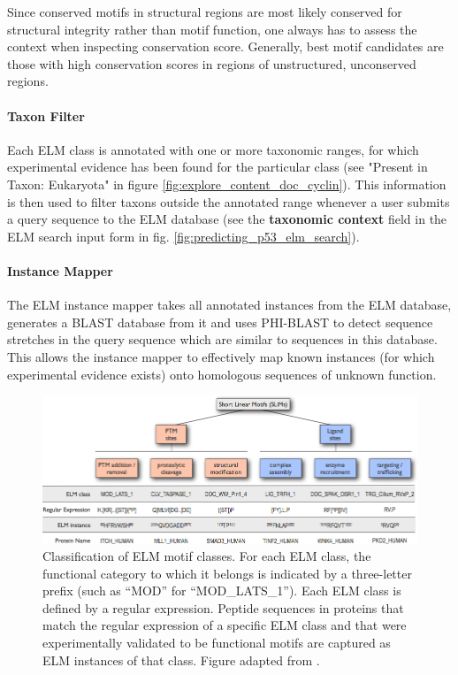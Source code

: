 \documentclass[12pt]{article}
\newcommand\button[1]{%
	\textbf{#1}%
}
\begin{document}
Since conserved motifs in structural regions are most likely conserved for
structural integrity rather than motif function, one always has to assess the
context when inspecting conservation score. Generally, best motif candidates
are those with high conservation scores in regions of unstructured, unconserved
regions.


\paragraph*{Taxon Filter}\label{TaxonFilter}

Each ELM class is annotated with one or more taxonomic ranges, for which
experimental evidence has been found for the particular class
(see "Present in Taxon: Eukaryota" in figure
\ref{fig:explore_content_doc_cyclin}). This information is then used to filter taxons
outside the annotated range whenever a user submits a query sequence to the ELM
database (see the \button{taxonomic context} field in the ELM search input form in fig.
\ref{fig:predicting_p53_elm_search}).

\paragraph*{Instance Mapper}\label{InstanceMapper}

The ELM instance mapper takes all annotated instances from the ELM database,
generates a BLAST database from it and uses PHI-BLAST \citep{9705509}
to detect sequence stretches in
the query sequence which are similar to sequences in this database. This allows
the instance mapper to effectively map known instances (for which experimental
evidence exists) onto homologous sequences of unknown function.

\begin{figure}[h!]
\centering
\includegraphics[width=\textwidth]{Figures/Introduction/functional_classification_of_SLiMs.png}
\caption{
Classification of ELM motif classes.
For each ELM class, the functional category to which it belongs is indicated by
a three-letter prefix (such as ``MOD'' for ``MOD\_LATS\_1'').
Each ELM class is defined by a regular expression. Peptide sequences in
proteins that match the regular expression of a specific ELM class and that
were experimentally validated to be functional motifs are captured as ELM
instances of that class.
Figure adapted from \cite{24773235}.
}
\label{fig:SLiMclasses}
\end{figure}
\end{document}

